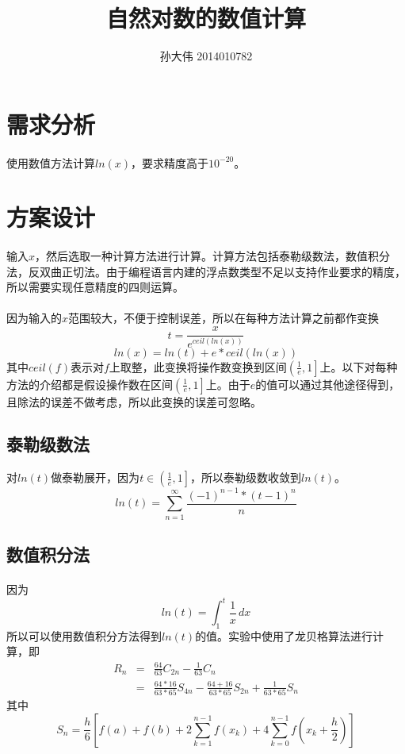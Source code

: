 \documentclass[UTF8,twocolum,titlepage]{ctexart}
\title{自然对数的数值计算}
\author{孙大伟 2014010782}
\date{}
\begin{document}
\maketitle
\boldmath
\section*{需求分析}
\paragraph{}
使用数值方法计算$ln\left(x\right)$，要求精度高于$10^{-20}$。
\section*{方案设计}
\paragraph{}
输入$x$，然后选取一种计算方法进行计算。计算方法包括泰勒级数法，数值积分法，反双曲正切法。由于编程语言内建的浮点数类型不足以支持作业要求的精度，所以需要实现任意精度的四则运算。
\paragraph{}
因为输入的$x$范围较大，不便于控制误差，所以在每种方法计算之前都作变换$$t=\frac{x}{e^{ceil\left(ln\left(x\right)\right)}}$$ $$ln\left(x\right)=ln\left(t\right)+e*ceil\left(ln\left(x\right)\right)$$其中$ceil\left(f\right)$表示对$f$上取整，此变换将操作数变换到区间$\left(\frac{1}{e},1 \right]$上。以下对每种方法的介绍都是假设操作数在区间$\left(\frac{1}{e},1 \right]$上。由于$e$的值可以通过其他途径得到，且除法的误差不做考虑，所以此变换的误差可忽略。
\subsection*{泰勒级数法}
对$ln\left(t\right)$做泰勒展开，因为$t\in\left(\frac{1}{e},1 \right]$，所以泰勒级数收敛到$ln\left(t\right)$。
$$ln\left(t\right)=\sum\limits_{n=1}^{\infty}\frac{\left(-1\right)^{n-1}*\left(t-1\right)^{n}}{n}$$
\subsection*{数值积分法}
\paragraph{}
因为$$ln\left(t\right)=\int_1^t \frac{1}{x}\,dx$$所以可以使用数值积分方法得到$ln\left(t\right)$的值。实验中使用了龙贝格算法进行计算，即
\begin{eqnarray*}
R_n&=&\frac{64}{63}C_{2n}-\frac{1}{63}C_{n}\\
&=&\frac{64*16}{63*65}S_{4n}-\frac{64+16}{63*65}S_{2n}+\frac{1}{63*65}S_{n}
\end{eqnarray*}
其中
$$S_n=\frac{h}{6}\left[f(a)+f(b)+2\sum_{k=1}^{n-1}f(x_{k})+4\sum_{k=0}^{n-1}f(x_{k}+\frac{h}{2})\right]$$
\end{document}
